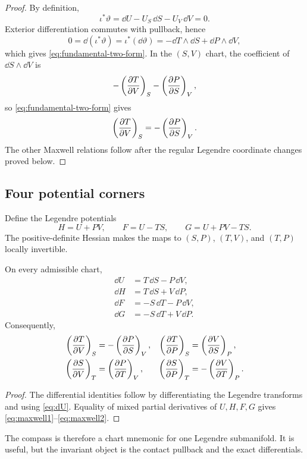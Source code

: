 \begin{proof}
By definition,
\[
\iota^*\vartheta
=\dd U-U_S\,\dd S-U_V\,\dd V=0.
\]
Exterior differentiation commutes with pullback, hence
\[
0=\dd(\iota^*\vartheta)=\iota^*(\dd\vartheta)
=-\dd T\wedge\dd S+\dd P\wedge\dd V,
\]
which gives \eqref{eq:fundamental-two-form}.  In the $(S,V)$ chart, the coefficient of $\dd S\wedge\dd V$ is
\[
-\left(\frac{\partial T}{\partial V}\right)_{S}-\left(\frac{\partial P}{\partial S}\right)_{V},
\]
so \eqref{eq:fundamental-two-form} gives
\[
\left(\frac{\partial T}{\partial V}\right)_{S}=-\left(\frac{\partial P}{\partial S}\right)_{V}.
\]
The other Maxwell relations follow after the regular Legendre coordinate changes proved below.
\end{proof}

\subsection{Four potential corners}

Define the Legendre potentials
\[
H=U+PV,\qquad F=U-TS,\qquad G=U+PV-TS.
\]
The positive-definite Hessian makes the maps to $(S,P)$, $(T,V)$, and $(T,P)$ locally invertible.

\begin{proposition}
On every admissible chart,
\begin{align}
\dd U&=T\,\dd S-P\,\dd V,\label{eq:dU}\\
\dd H&=T\,\dd S+V\,\dd P,\label{eq:dH}\\
\dd F&=-S\,\dd T-P\,\dd V,\label{eq:dF}\\
\dd G&=-S\,\dd T+V\,\dd P.\label{eq:dG}
\end{align}
Consequently,
\begin{align}
\left(\frac{\partial T}{\partial V}\right)_{S}&=-\left(\frac{\partial P}{\partial S}\right)_{V},&
\left(\frac{\partial T}{\partial P}\right)_{S}&=\left(\frac{\partial V}{\partial S}\right)_{P},\label{eq:maxwell1}\\
\left(\frac{\partial S}{\partial V}\right)_{T}&=\left(\frac{\partial P}{\partial T}\right)_{V},&
\left(\frac{\partial S}{\partial P}\right)_{T}&=-\left(\frac{\partial V}{\partial T}\right)_{P}.\label{eq:maxwell2}
\end{align}
\end{proposition}

\begin{proof}
The differential identities follow by differentiating the Legendre transforms and using \eqref{eq:dU}.  Equality of mixed partial derivatives of $U,H,F,G$ gives \eqref{eq:maxwell1}--\eqref{eq:maxwell2}.
\end{proof}

The compass is therefore a chart mnemonic for one Legendre submanifold.  It is useful, but the invariant object is the contact pullback and the exact differentials.


